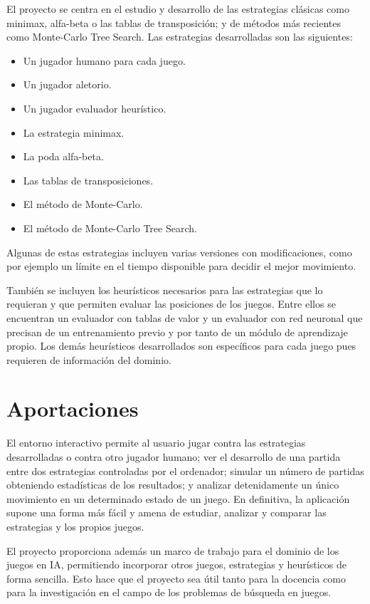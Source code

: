 El proyecto se centra en el estudio y desarrollo de las estrategias clásicas como minimax, alfa-beta o las tablas de transposición; y de métodos más recientes como Monte-Carlo Tree Search.
Las estrategias desarrolladas son las siguientes:
\begin{itemize}
	\item Un jugador humano para cada juego.
	\item Un jugador aletorio.
	\item Un jugador evaluador heurístico.
	\item La estrategia minimax.
	\item La poda alfa-beta.
	\item Las tablas de transposiciones.
	\item El método de Monte-Carlo.
	\item El método de Monte-Carlo Tree Search.
\end{itemize}
Algunas de estas estrategias incluyen varias versiones con modificaciones, como por ejemplo un límite en el tiempo disponible para decidir el mejor movimiento.

También se incluyen los heurísticos necesarios para las estrategias que lo requieran y que permiten evaluar las posiciones de los juegos.
Entre ellos se encuentran un evaluador con tablas de valor y un evaluador con red neuronal que precisan de un entrenamiento previo y por tanto de un módulo de aprendizaje propio.
Los demás heurísticos desarrollados son específicos para cada juego pues requieren de información del dominio.

\section{Aportaciones}
\label{sec:aportaciones}
El entorno interactivo permite al usuario jugar contra las estrategias desarrolladas o contra otro jugador humano; ver el desarrollo de una partida entre dos estrategias controladas por el ordenador; simular un número de partidas obteniendo estadísticas de los resultados; y analizar detenidamente un único movimiento en un determinado estado de un juego.
En definitiva, la aplicación supone una forma más fácil y amena de estudiar, analizar y comparar las estrategias y los propios juegos.

El proyecto proporciona además un marco de trabajo para el dominio de los juegos en IA, permitiendo incorporar otros juegos, estrategias y heurísticos de forma sencilla.
Esto hace que el proyecto sea útil tanto para la docencia como para la investigación en el campo de los problemas de búsqueda en juegos.

